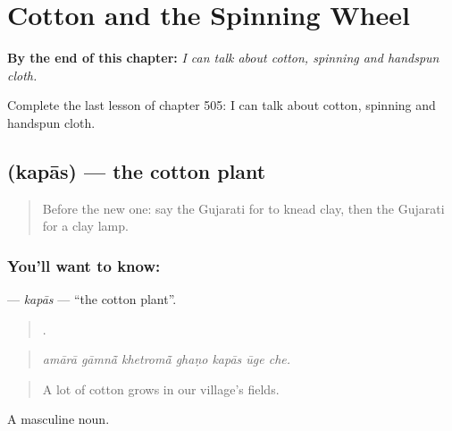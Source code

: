 
\chapter{Cotton and the Spinning Wheel}
\label{ch:gu-cotton-and-the-spinning-wheel}

\begin{chapteropening}
\textbf{By the end of this chapter:} \emph{I can talk about cotton, spinning and handspun cloth.}

Complete the last lesson of chapter 505: I can talk about cotton, spinning and handspun cloth.
\end{chapteropening}

\section[\texorpdfstring{\gu{કપાસ} (kapās)}{કપાસ (kapās)}]{ (kapās) — the cotton plant}

\label{lesson:GU-C505-kapas}



\begin{quote}
Before the new one: say the Gujarati for to knead clay, then the Gujarati for a clay lamp.
\end{quote}

\subsection*{You'll want to know: }
\textbf{} — \emph{kapās} — \textquotedblleft{}the cotton plant\textquotedblright{}.

\begin{quote}
      .
\end{quote}

\begin{quote}
\emph{amārā gāmnā̃ khetromā̃ ghaṇo kapās ūge che.}
\end{quote}

\begin{quote}
A lot of cotton grows in our village's fields.
\end{quote}

A masculine noun.

